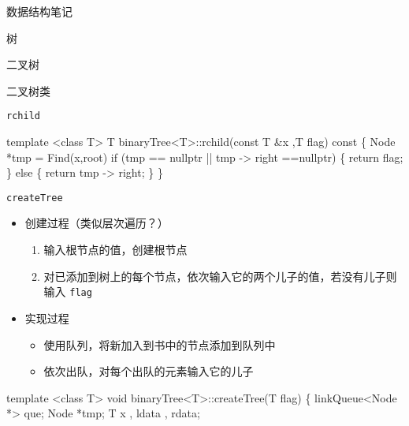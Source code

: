 \documentclass[
  ignorenonframetext,
]{beamer}
\newenvironment{Shaded}{}{}
\newcommand{\NormalTok}[1]{#1}
\providecommand{\tightlist}{%
  \setlength{\itemsep}{0pt}\setlength{\parskip}{0pt}}
\begin{document}
\begin{frame}[fragile]{数据结构笔记}
\begin{block}{树}
\begin{block}{二叉树}
\begin{block}{二叉树类}
\begin{block}{\texttt{rchild}}
\protect{}\label{rchild}
\begin{Shaded}
\begin{Highlighting}[]
\NormalTok{template \textless{}class T\textgreater{}}
\NormalTok{T binaryTree\textless{}T\textgreater{}::rchild(const T \&x ,T flag) const}
\NormalTok{\{}
\NormalTok{  Node *tmp = Find(x,root)}
\NormalTok{  if (tmp == nullptr || tmp {-}\textgreater{} right ==nullptr)}
\NormalTok{  \{}
\NormalTok{    return flag;}
\NormalTok{  \}}
\NormalTok{  else}
\NormalTok{  \{}
\NormalTok{    return tmp {-}\textgreater{} right;}
\NormalTok{  \}}
\NormalTok{\}}
\end{Highlighting}
\end{Shaded}
\end{block}

\begin{block}{\texttt{createTree}}
\protect{}\label{createtree}
\begin{itemize}
\tightlist
\item
  创建过程（类似层次遍历？）

  \begin{enumerate}
  \tightlist
  \item
    输入根节点的值，创建根节点
  \item
    对已添加到树上的每个节点，依次输入它的两个儿子的值，若没有儿子则输入
    \texttt{flag}
  \end{enumerate}
\item
  实现过程

  \begin{itemize}
  \tightlist
  \item
    使用队列，将新加入到书中的节点添加到队列中
  \item
    依次出队，对每个出队的元素输入它的儿子
  \end{itemize}
\end{itemize}

\begin{Shaded}
\begin{Highlighting}[]
\NormalTok{template \textless{}class T\textgreater{}}
\NormalTok{void binaryTree\textless{}T\textgreater{}::createTree(T flag)}
\NormalTok{\{}
\NormalTok{  linkQueue\textless{}Node *\textgreater{} que;}
\NormalTok{  Node *tmp;}
\NormalTok{  T x , ldata , rdata;}


\end{Highlighting}
\end{Shaded}
\end{block}
\end{block}
\end{block}
\end{block}
\end{frame}
\end{document}
